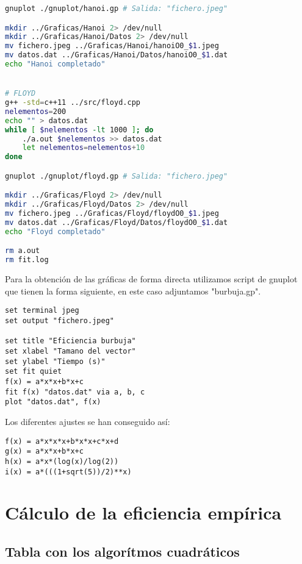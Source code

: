 \documentclass[11pt,spanish]{article} %
\begin{document}
\begin{lstlisting}[language=bash]
gnuplot ./gnuplot/hanoi.gp # Salida: "fichero.jpeg"

mkdir ../Graficas/Hanoi 2> /dev/null
mkdir ../Graficas/Hanoi/Datos 2> /dev/null
mv fichero.jpeg ../Graficas/Hanoi/hanoiO0_$1.jpeg
mv datos.dat ../Graficas/Hanoi/Datos/hanoiO0_$1.dat
echo "Hanoi completado"


# FLOYD
g++ -std=c++11 ../src/floyd.cpp
nelementos=200
echo "" > datos.dat
while [ $nelementos -lt 1000 ]; do
    ./a.out $nelementos >> datos.dat
    let nelementos=nelementos+10
done

gnuplot ./gnuplot/floyd.gp # Salida: "fichero.jpeg"

mkdir ../Graficas/Floyd 2> /dev/null
mkdir ../Graficas/Floyd/Datos 2> /dev/null
mv fichero.jpeg ../Graficas/Floyd/floydO0_$1.jpeg
mv datos.dat ../Graficas/Floyd/Datos/floydO0_$1.dat
echo "Floyd completado"

rm a.out
rm fit.log
\end{lstlisting}

Para la obtención de las gráficas de forma directa utilizamos script de gnuplot que tienen la forma siguiente, en este caso adjuntamos "burbuja.gp". 

\begin{lstlisting}[language=gnuplot]
set terminal jpeg
set output "fichero.jpeg"

set title "Eficiencia burbuja"
set xlabel "Tamano del vector"
set ylabel "Tiempo (s)"
set fit quiet
f(x) = a*x*x+b*x+c
fit f(x) "datos.dat" via a, b, c
plot "datos.dat", f(x)
\end{lstlisting}

Los diferentes ajustes se han conseguido así:

\begin{lstlisting}[language=gnuplot]
f(x) = a*x*x*x+b*x*x+c*x+d
g(x) = a*x*x+b*x+c
h(x) = a*x*(log(x)/log(2))
i(x) = a*(((1+sqrt(5))/2)**x)
\end{lstlisting}


\newpage

\section{C\'alculo de la eficiencia emp\'irica}

\subsection{Tabla con los algor\'itmos cuadr\'aticos}
\end{document}
